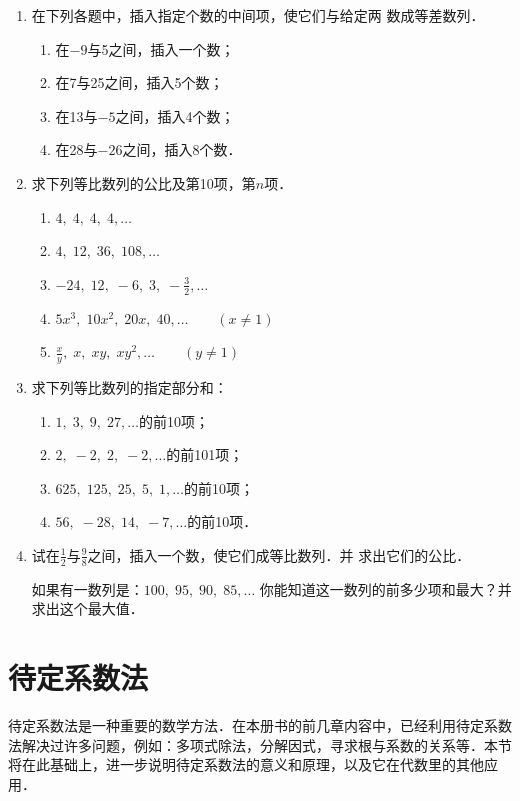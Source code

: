 \begin{enumerate}
\item  在下列各题中，插入指定个数的中间项，使它们与给定两
数成等差数列．
\begin{enumerate}
    \item 在$-9$与5之间，插入一个数；
    \item 在7与25之间，插入5个数；
    \item 在13与$-5$之间，插入4个数；
    \item 在28与$-26$之间，插入8个数．
\end{enumerate}

\item  求下列等比数列的公比及第10项，第$n$项．
\begin{enumerate}
    \item $4,\; 4,\; 4,\; 4,\ldots$
    \item $4,\; 12,\; 36,\; 108, \ldots$
    \item $-24,\; 12,\; -6,\; 3,\; -\frac{3}{2},\ldots$
    \item $5x^3,\; 10x^2,\; 20x,\; 40, \ldots \qquad  (x\ne 1)$
    \item $\frac{x}{y},\; x,\; xy,\; xy^2,\ldots\qquad (y\ne 1)$
\end{enumerate}

\item  求下列等比数列的指定部分和：
\begin{enumerate}
\item $1,\; 3,\; 9,\; 27,\ldots$的前10项；
\item $2,\; -2,\; 2,\;-2,\ldots$的前101项；
\item $625,\; 125,\; 25,\; 5,\; 1,\ldots$的前10项；
\item $56,\;-28,\; 14,\;-7,\ldots$的前10项．
\end{enumerate}

\item  试在$\frac{1}{2}$与$\frac{9}{8}$之间，插入一个数，使它们成等比数列．并
求出它们的公比．

\staritem 如果有一数列是：$100,\; 95,\; 90,\; 85,\ldots$
你能知道这一数列的前多少项和最大？并求出这个最大值．

\end{enumerate}

\section{待定系数法}
待定系数法是一种重要的数学方法．在本册书的前几章内容中，已经利用待定系数法解决过许多问题，例如：多项式除法，分解因式，寻求根与系数的关系等．本节将在此基础上，进一步说明待定系数法的意义和原理，以及它在代数里的其他应用．

